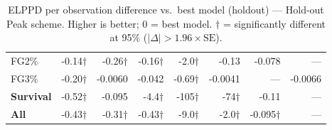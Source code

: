 \begin{table}[H]
{\begin{tabular}{lrrrrrrr}
FG2\% & -0.14$\dagger$ & -0.26$\dagger$ & -0.16$\dagger$ & -2.0$\dagger$ & -0.13 & -0.078 & --- \\[2pt]
FG3\% & -0.20$\dagger$ & -0.0060 & -0.042 & -0.69$\dagger$ & -0.0041 & --- & -0.0066 \\[2pt]
\midrule
\textbf{Survival} & -0.52$\dagger$ & -0.095 & -4.4$\dagger$ & -105$\dagger$ & -74$\dagger$ & -0.11 & --- \\
\midrule
\textbf{All} & -0.43$\dagger$ & -0.31$\dagger$ & -0.43$\dagger$ & -9.0$\dagger$ & -2.0$\dagger$ & -0.095$\dagger$ & --- \\
\bottomrule
\end{tabular}
}
\caption{ELPPD per observation difference vs.\ best model (holdout) --- Hold-out Peak scheme. Higher is better; 0 = best model. $\dagger$ = significantly different at 95\% ($|\Delta|>1.96\times\mathrm{SE}$).}
\label{tab:elppd_holdout_peak}
\end{table}

